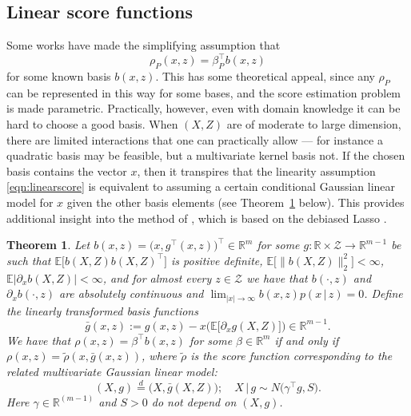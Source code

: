 \documentclass[aos]{imsart}
\newcommand{\R}{\mathbb{R}}
\newcommand{\E}{\mathbb{E}}
\newcommand{\eqdist}{\stackrel{d}{=}}
\newcommand{\given}{\,|\,}
\newtheorem{theorem}{Theorem}
\begin{document}
	\subsection{Linear score functions}
	Some works have made the simplifying assumption that
	\begin{equation}
				\rho_P(x,z) = \beta_P ^{\top} b(x,z) \label{eqn:linearscore}
			\end{equation} for some known basis $b(x,z)$. This has some theoretical appeal, since any $\rho_P$ can be represented in this way for some bases, and the score estimation problem is made parametric. Practically, however, even with domain knowledge it can be hard to choose a good basis. When $(X,Z)$ are of moderate to large dimension, there are limited interactions that one can practically allow --- for instance a quadratic basis may be feasible, but a multivariate kernel basis not. If the chosen basis contains the vector $x$, then it transpires that the linearity assumption \eqref{eqn:linearscore} is equivalent to assuming a certain conditional Gaussian linear model for $x$ given the other basis elements (see Theorem~\ref{thm:basisgaussian} below). This provides additional insight into the method of \cite{RothenhauslerICE}, which is based on the debiased Lasso \citep{ZhangDebiased, vandeGeerDebiased}.
	\begin{theorem}
		\label{thm:basisgaussian}
		Let $b(x,z)=\big(x,g^{\top}(x,z)\big)^{\top} \in \R^m$ for some $g:\R \times \mathcal{Z}\to \R^{m-1}$ be such that $\E\big[b(X,Z)b(X,Z)^{\top}\big]$ is positive definite, $\E\big[\|b(X,Z)\|^2_2\big]<\infty$, $\E|\partial_x b(X,Z)|<\infty$, and for almost every $z\in\mathcal{Z}$ we have that $b(\cdot,z)$ and $\partial_x b(\cdot,z)$ are absolutely continuous and $\lim_{|x|\to\infty}b(x,z)p(x\given  z)=0$. Define the linearly transformed basis functions
		\begin{equation*}
			\bar g(x,z) := g(x,z) - x \big(\E\big[ \partial_x g(X,Z)\big]\big) \in \R^{m-1}.
		\end{equation*}
		We have that $\rho(x,z)=\beta^{\top} b(x,z)$ for some $\beta \in \R^{m}$ if and only if $\rho(x,z)=\tilde \rho(x,\bar g(x,z))$, where $\tilde \rho$ is the score function corresponding to the related multivariate Gaussian linear model:
		\begin{equation*}
			(X,g) \eqdist \Big(X, \bar g(X,Z) \Big);\quad X\given  g \sim N\big(\gamma^{\top} g, S).
		\end{equation*}
		Here $\gamma\in \R^{(m-1)}$ and $S>0$ do not depend on $(X,g)$. %
	\end{theorem}
\end{document}

